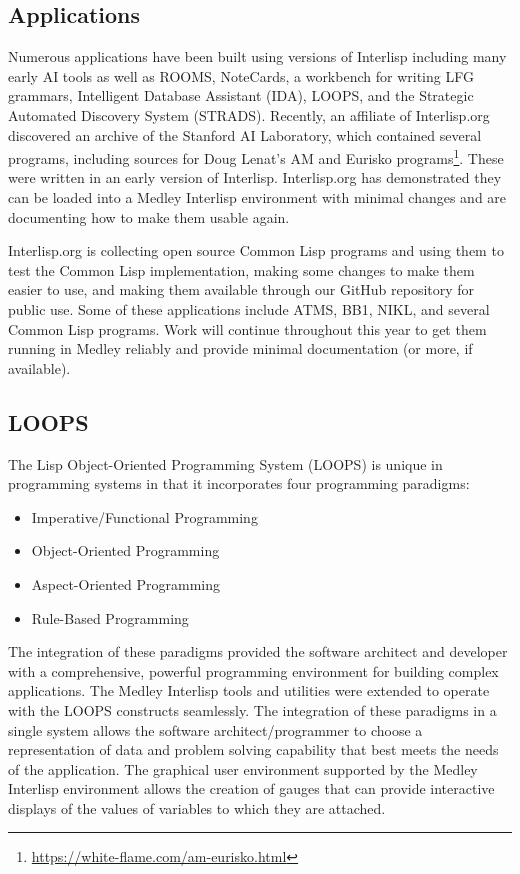 \documentclass[sigconf]{acmart}
\begin{document}
\subsection{Applications}

Numerous applications have been built using versions of Interlisp including many early AI tools as well as ROOMS\cite{Henderson86}, NoteCards\cite{Xerox85}, a workbench for writing LFG grammars\cite{Kaplan03}, Intelligent Database Assistant (IDA), LOOPS, and the Strategic Automated Discovery System (STRADS). Recently, an affiliate of Interlisp.org discovered an archive of the Stanford AI Laboratory, which contained several programs, including sources for Doug Lenat's AM and Eurisko programs\footnote{\url{https://white-flame.com/am-eurisko.html}}. These were written in an early version of Interlisp. Interlisp.org has demonstrated they can be loaded into a Medley Interlisp environment with minimal changes and are documenting how to make them usable again.

Interlisp.org is collecting open source Common Lisp programs and using them to test the Common Lisp implementation, making some changes to make them easier to use, and making them available through our GitHub repository for public use. Some of these applications include ATMS, BB1, NIKL, and several Common Lisp programs. Work will continue throughout this year to get them running in Medley reliably and provide minimal documentation (or more, if available).

\subsection{LOOPS}

The Lisp Object-Oriented Programming System (LOOPS) is unique in programming systems in that it incorporates four programming paradigms:

\begin{itemize}
  \item Imperative/Functional Programming
  \item Object-Oriented Programming
  \item Aspect-Oriented Programming
  \item Rule-Based Programming
\end{itemize}
    
The integration of these paradigms provided the software architect and developer with a comprehensive, powerful programming environment for building complex applications\cite{Bobrow83}. The Medley Interlisp tools and utilities were extended to operate with the LOOPS constructs seamlessly. The integration of these paradigms in a single system allows the software architect/programmer to choose a representation of data and problem solving capability that best meets the needs of the application. The graphical user environment supported by the Medley Interlisp environment allows the creation of gauges that can provide interactive displays of the values of variables to which they are attached.
\end{document}
